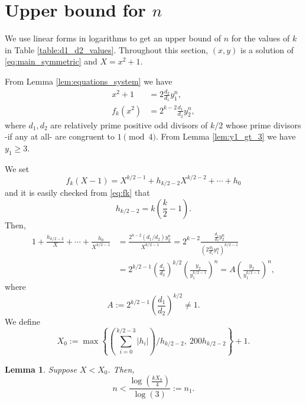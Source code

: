 \documentclass[12pt]{amsart}
\numberwithin{equation}{section}
\newtheorem{lemma}{Lemma}[section]
\theoremstyle{definition}
\theoremstyle{remark}
\begin{document}
\section{Upper bound for $n$}\label{sec:upper_bound_n}
%
We use linear forms in logarithms to get an upper bound of $n$ for the values of $k$ in Table \ref{table:d1_d2_values}. Throughout this section, $(x,y)$ is a solution of \eqref{eq:main_symmetric} and $X=x^2+1$.  

From Lemma \ref{lem:equations_system} we have 
\begin{equation} \label{eq:x^2+1_and_fk(x^2)}
\begin{aligned}
    x^2 + 1 & = 2\frac{d_2}{d_1}y_1^n, 
    \\
    f_k(x^2) & = 2^{k-2}\frac{d_1}{d_2}y_2^n,
\end{aligned}
\end{equation}
%
where $d_1,d_2$ are relatively prime positive odd divisors of $k/2$ whose prime divisors -if any at all- are congruent to $1\pmod{4}$. From Lemma \ref{lem:y1_gt_3} we have $y_1\geq 3$.

We set 
\begin{equation*}
    f_k(X-1)=X^{k/2-1} + h_{k/2-2}X^{k/2-2} + \cdots + h_0
\end{equation*}
and it is easily checked from \eqref{eq:fk} that
\begin{equation*}
h_{k/2-2}= k\left(\frac{k}{2}-1\right).
\end{equation*}
Then,
\begin{align*}
1 + \frac{h_{k/2-2}}{X} + \cdots + \frac{h_0}{X^{k/2-1}} 
&  = \frac{2^{k-2}(d_1/d_2)y_2^n}{X^{k/2-1}} =
2^{k-2}\frac{\frac{d_1}{d_2}y_2^n}{\left(2\frac{d_2}{d_1}y_1^n\right)^{k/2-1}} \\
& =2^{k/2-1}
\left(\frac{d_1}{d_2}\right)^{k/2}\left(\frac{y_2}{y_1^{k/2-1}}\right)^n = A\left(\frac{y_2}{y_1^{k/2-1}}\right)^n,
\end{align*}
where
\begin{equation*} 
    A:= 2^{k/2-1}
    \left(\frac{d_1}{d_2}\right)^{k/2}
    \ne 1.
\end{equation*}
We define 
\begin{equation*} 
    X_0:=
    \max\left\{\left(\sum_{i=0}^{k/2-3}|h_i|\right)/h_{k/2-2},\:
    200h_{k/2-2}\right\}+1.
\end{equation*}

\begin{lemma}
Suppose $X < X_0$. Then,
\begin{equation*}
    n < \frac{\log\left(\frac{kX_0}{4}\right)}{\log(3)} := n_1.
\end{equation*}
\end{lemma}
\end{document}
